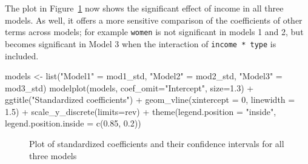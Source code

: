\documentclass[
  letterpaper,
  10pt,
  krantz2]{krantz}
\makeatletter
\newenvironment{Shaded}{\begin{snugshade}}{\end{snugshade}}
\newcommand{\AttributeTok}[1]{\textcolor[rgb]{0.40,0.45,0.13}{#1}}
\newcommand{\DecValTok}[1]{\textcolor[rgb]{0.68,0.00,0.00}{#1}}
\newcommand{\FloatTok}[1]{\textcolor[rgb]{0.68,0.00,0.00}{#1}}
\newcommand{\FunctionTok}[1]{\textcolor[rgb]{0.28,0.35,0.67}{#1}}
\newcommand{\NormalTok}[1]{\textcolor[rgb]{0.00,0.23,0.31}{#1}}
\newcommand{\OtherTok}[1]{\textcolor[rgb]{0.00,0.23,0.31}{#1}}
\newcommand{\SpecialCharTok}[1]{\textcolor[rgb]{0.37,0.37,0.37}{#1}}
\newcommand{\StringTok}[1]{\textcolor[rgb]{0.13,0.47,0.30}{#1}}
\newenvironment{kframe}{%
  \medskip{}
  \setlength{\fboxsep}{.8em}
  \def\at@end@of@kframe{}%
  \ifinner\ifhmode%
  \def\at@end@of@kframe{\end{minipage}}%
  \begin{minipage}{\columnwidth}%
  \fi\fi%
  \def\FrameCommand##1{\hskip\@totalleftmargin \hskip-\fboxsep
  \colorbox{shadecolor}{##1}\hskip-\fboxsep
      \hskip-\linewidth \hskip-\@totalleftmargin \hskip\columnwidth}%
  \MakeFramed {\advance\hsize-\width
    \@totalleftmargin\z@ \linewidth\hsize
    \@setminipage}}%
{\par\unskip\endMakeFramed%
  \at@end@of@kframe}
\renewenvironment{Shaded}{\begin{kframe}}{\end{kframe}}
\makeatother
\begin{document}
The plot in Figure~\ref{fig-modelplot3} now shows the significant effect
of income in all three models. As well, it offers a more sensitive
comparison of the coefficients of other terms across models; for example
\texttt{women} is not significant in models 1 and 2, but becomes
significant in Model 3 when the interaction of \texttt{income\ *\ type}
is included.

\begin{Shaded}
\begin{Highlighting}[]
\NormalTok{models }\OtherTok{\textless{}{-}} \FunctionTok{list}\NormalTok{(}\StringTok{"Model1"} \OtherTok{=}\NormalTok{ mod1\_std, }\StringTok{"Model2"} \OtherTok{=}\NormalTok{ mod2\_std, }\StringTok{"Model3"} \OtherTok{=}\NormalTok{ mod3\_std)}
\FunctionTok{modelplot}\NormalTok{(models, }
          \AttributeTok{coef\_omit=}\StringTok{"Intercept"}\NormalTok{, }\AttributeTok{size=}\FloatTok{1.3}\NormalTok{) }\SpecialCharTok{+}
  \FunctionTok{ggtitle}\NormalTok{(}\StringTok{"Standardized coefficients"}\NormalTok{) }\SpecialCharTok{+}
  \FunctionTok{geom\_vline}\NormalTok{(}\AttributeTok{xintercept =} \DecValTok{0}\NormalTok{, }\AttributeTok{linewidth =} \FloatTok{1.5}\NormalTok{) }\SpecialCharTok{+}
  \FunctionTok{scale\_y\_discrete}\NormalTok{(}\AttributeTok{limits=}\NormalTok{rev) }\SpecialCharTok{+}
  \FunctionTok{theme}\NormalTok{(}\AttributeTok{legend.position =} \StringTok{"inside"}\NormalTok{,}
        \AttributeTok{legend.position.inside =} \FunctionTok{c}\NormalTok{(}\FloatTok{0.85}\NormalTok{, }\FloatTok{0.2}\NormalTok{))}
\end{Highlighting}
\end{Shaded}

\begin{figure}[H]


\caption{\label{fig-modelplot3}Plot of standardized coefficients and
their confidence intervals for all three models}

\end{figure}%
\end{document}
